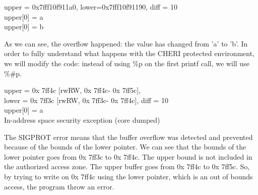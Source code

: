 \documentclass[a4paper, 11pt]{article}
\newcommand{\ptraddress}[1]{%
    0x\textcolor{gray}{\scalebox{0.9}{fffffff}}#1%
}
\begin{document}
\begin{tcolorbox}[colback=gray!5!white, colframe=gray!75!black, title=Output on a classic \Gls{risc-v} environment (no CHERI Protection)]
upper = 0x7fff10f911a0, lower=0x7fff10f91190, diff = 10\\
upper[0] = a\\
upper[0] = b
\end{tcolorbox}
As we can see, the overflow happened: the value has changed from 'a' to 'b'.\break
In order to fully understand what happens with the CHERI protected environment, we will modify the code: instead of using \%p on the first printf call, we will use \%\#p.

\begin{tcolorbox}[colback=gray!5!white, colframe=blue!75!black, title=Output on an environment protected by CHERI]
	upper = \ptraddress{}7ff4c [rwRW,\ptraddress{}7ff4c-\ptraddress{}7ff5c],\\
    lower = \ptraddress{}7ff3c [rwRW,\ptraddress{}7ff3c-\ptraddress{}7ff4c], diff = 10\\
	upper[0] = a\\
	In-address space security exception (core dumped)
\end{tcolorbox}
The SIGPROT error means that the buffer overflow was detected and prevented because of the bounds of the lower pointer.
We can see that the bounds of the lower pointer goes from \ptraddress{}7ff3c to \ptraddress{}7ff4c. The upper bound is not included in the authorized access zone. 
The upper buffer goes from \ptraddress{}7ff4c to \ptraddress{}7ff5c. So, by trying to write on \ptraddress{}7ff4c using the lower pointer, which is an out of bounds access, the program throw an error.



\end{document}
